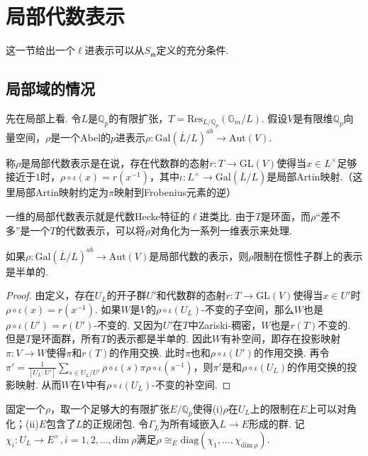 \section{局部代数表示}

这一节给出一个$\ell$进表示可以从$S_{\mathfrak{m}}$定义的充分条件.

\subsection*{局部域的情况}
先在局部上看. 令$L$是$\mathbb{Q}_p$的有限扩张，$T = \mathrm{Res}_{L/\mathbb{Q}_p}(\mathbb{G}_m / L)$.
假设$V$是有限维$\mathbb{Q}_p$向量空间，$\rho$是一个Abel的$p$进表示$\rho: \mathrm{Gal}(\overline{L}/L)^{ab} \to \mathrm{Aut}(V)$.

\begin{cdef}
    称$\rho$是局部代数表示是在说，存在代数群的态射$r:T\to \mathrm{GL}(V)$使得当$x\in L^{\times}$足够接近于$1$时，$\rho\circ \iota(x) = r(x^{-1})$，其中$\iota: L^{\times}\to \mathrm{Gal}(\overline{L}/L) $是局部Artin映射.（这里局部Artin映射约定为$\pi$映射到Frobenius元素的逆）
\end{cdef}

一维的局部代数表示就是代数Hecke特征的$\ell$进类比. 由于$T$是环面，而$\rho$“差不多”是一个$T$的代数表示，可以将$\rho$对角化为一系列一维表示来处理.

\begin{cprop}
    如果$\rho: \mathrm{Gal}(\overline{L}/L)^{ab} \to \mathrm{Aut}(V)$是局部代数的表示，则$\rho$限制在惯性子群上的表示是半单的.
\end{cprop}

\begin{proof}
    由定义，存在$U_L$的开子群$U'$和代数群的态射$r: T\to \mathrm{GL}(V)$使得当$x\in U'$时$\rho\circ \iota(x) = r(x^{-1})$. 如果$W$是$V$的$\rho\circ\iota(U_L)$-不变的子空间，那么$W$也是$\rho\circ\iota(U')=r(U')$-不变的. 又因为$U'$在$T$中Zariski-稠密，$W$也是$r(T)$不变的. 但是$T$是环面群，所有$T$的表示都是半单的. 因此$W$有补空间，即存在投影映射$\pi: V\to W$使得$\pi$和$r(T)$的作用交换. 此时$\pi$也和$\rho\circ\iota(U')$的作用交换. 再令$\pi' = \frac{1}{[U_L:U']} \sum_{s\in U_L/U'} \rho\circ \iota(s) \pi \rho\circ \iota(s^{-1})$，则$\pi'$是和$\rho\circ\iota(U_L)$的作用交换的投影映射. 从而$W$在$V$中有$\rho\circ\iota(U_L)$-不变的补空间.
\end{proof}

固定一个$\rho$，取一个足够大的有限扩张$E/\mathbb{Q}_p$使得(i)$\rho$在$U_L$上的限制在$E$上可以对角化；(ii)$E$包含了$L$的正规闭包. 令$\Gamma_{L}$为所有域嵌入$L\to E$形成的群. 记$\chi_i: U_L\to E^{\times}, i=1,2,\ldots,\mathrm{dim}\ \rho$满足$\rho \cong_{E} \mathrm{diag}(\chi_1,\ldots, \chi_{\mathrm{dim}\ \rho})$.


